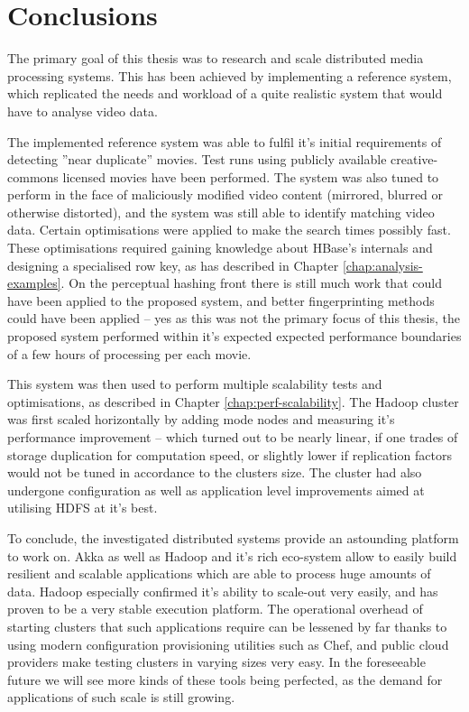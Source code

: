 \chapter{Conclusions}
\label{chap:conclusions}

The primary goal of this thesis was to research and scale distributed media processing systems. This has been achieved by implementing a reference system, which replicated the needs and workload of a quite realistic system that would have to analyse video data.

The implemented reference system was able to fulfil it's initial requirements of detecting ''near duplicate'' movies. Test runs using publicly available creative-commons licensed movies have been performed. The system was also tuned to perform in the face of maliciously modified video content (mirrored, blurred or otherwise distorted), and the system was still able to identify matching video data. Certain optimisations were applied to make the search times possibly fast. These optimisations required gaining knowledge about HBase's internals and designing a specialised row key, as has described in Chapter \ref{chap:analysis-examples}. On the perceptual hashing front there is still much work that could have been applied to the proposed system, and better fingerprinting methods could have been applied -- yes as this was not the primary focus of this thesis, the proposed system performed within it's expected expected performance boundaries of a few hours of processing per each movie.

This system was then used to perform multiple scalability tests and optimisations, as described in Chapter \ref{chap:perf-scalability}. The Hadoop cluster was first scaled horizontally by adding mode nodes and measuring it's performance improvement -- which turned out to be nearly linear, if one trades of storage duplication for computation speed, or slightly lower if replication factors would not be tuned in accordance to the clusters size. The cluster had also undergone configuration as well as application level improvements aimed at utilising HDFS at it's best.

To conclude, the investigated distributed systems provide an astounding platform to work on. Akka as well as Hadoop and it's rich eco-system allow to easily build resilient and scalable applications which are able to process huge amounts of data. Hadoop especially confirmed it's ability to scale-out very easily, and has proven to be a very stable execution platform. The operational overhead of starting clusters that such applications require can be lessened by far thanks to using modern configuration provisioning utilities such as Chef, and public cloud providers make testing clusters in varying sizes very easy. In the foreseeable future we will see more kinds of these tools being perfected, as the demand for applications of such scale is still growing.